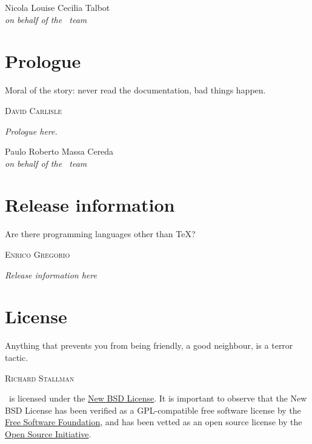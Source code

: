 \documentclass[a4paper,twoside,12pt]{memoir}
\begin{document}
\vfill

\begin{flushright}
Nicola Louise Cecilia Talbot\\
\emph{on behalf of the \arara\ team}
\end{flushright}

\chapter*{Prologue}
\label{chap:prologue}

\epigraph{Moral of the story: never read the documentation, bad things happen.}{\textsc{David Carlisle}}

\emph{Prologue here.}

\vfill

\begin{flushright}
Paulo Roberto Massa Cereda\\
\emph{on behalf of the \arara\ team}
\end{flushright}

\chapter*{Release information}
\label{chap:releaseinformation}

\epigraph{Are there programming languages other than \TeX?}{\textsc{Enrico Gregorio}}

\emph{Release information here}

\chapter*{License}
\label{chap:license}

\epigraph{Anything that prevents you from being friendly, a good neighbour, is a terror tactic.}{\textsc{Richard Stallman}}

\arara\ is licensed under the \href{http://www.opensource.org/licenses/bsd-license.php}{New BSD License}. It is important to observe that the New BSD License has been verified as a GPL-compatible free software license by the \href{http://www.fsf.org/}{Free Software Foundation}, and has been vetted as an open source license by the \href{http://www.opensource.org/}{Open Source Initiative}.

\vfill
\end{document}
